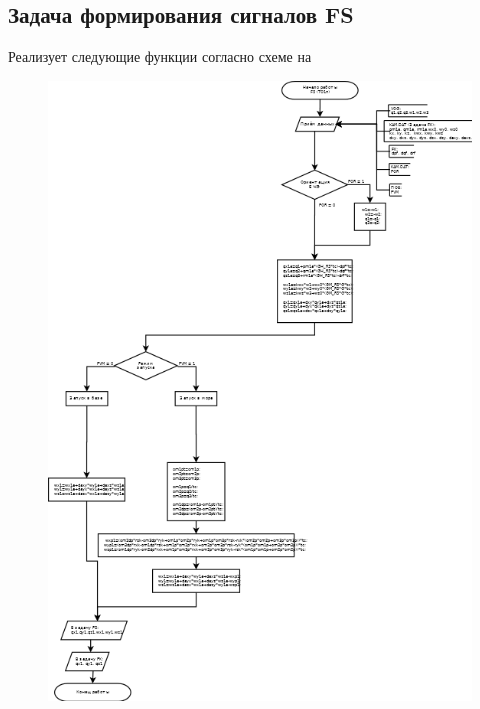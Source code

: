 \subsection{Задача формирования сигналов FS}
Реализует следующие функции согласно схеме на
\begin{figure}[H]
    \centering
    \includegraphics[width=1\linewidth]{images/FS.png}
    \label{fig:FS}
\end{figure}
